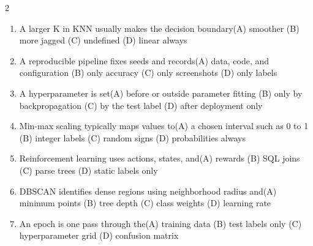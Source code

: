 \documentclass[a4paper]{article}
\begin{document}
\begin{multicols*}{2}
\begin{enumerate}
\item A larger K in KNN usually makes the decision boundary\newline\hspace*{0.6em}(A) smoother \quad (B) more jagged \newline\hspace*{0.6em}(C) undefined \quad (D) linear always
\item A reproducible pipeline fixes seeds and records\newline\hspace*{0.6em}(A) data, code, and configuration \quad (B) only accuracy \newline\hspace*{0.6em}(C) only screenshots \quad (D) only labels
\item A hyperparameter is set\newline\hspace*{0.6em}(A) before or outside parameter fitting \quad (B) only by backpropagation \newline\hspace*{0.6em}(C) by the test label \quad (D) after deployment only
\item Min-max scaling typically maps values to\newline\hspace*{0.6em}(A) a chosen interval such as 0 to 1 \quad (B) integer labels \newline\hspace*{0.6em}(C) random signs \quad (D) probabilities always
\item Reinforcement learning uses actions, states, and\newline\hspace*{0.6em}(A) rewards \quad (B) SQL joins \newline\hspace*{0.6em}(C) parse trees \quad (D) static labels only
\item DBSCAN identifies dense regions using neighborhood radius and\newline\hspace*{0.6em}(A) minimum points \quad (B) tree depth \newline\hspace*{0.6em}(C) class weights \quad (D) learning rate
\item An epoch is one pass through the\newline\hspace*{0.6em}(A) training data \quad (B) test labels only \newline\hspace*{0.6em}(C) hyperparameter grid \quad (D) confusion matrix

\end{enumerate}
\end{multicols*}
\end{document}
